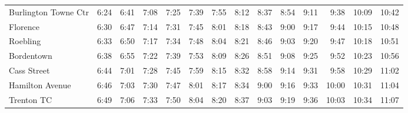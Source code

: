 \begin{center}
\begin{tabular}{@{}lrrrrrrrrrrrrr@{}}
Burlington Towne Ctr & 6:24 & 6:41 & 7:08 & 7:25 & 7:39 & 7:55 & 8:12 & 8:37 & 8:54 & 9:11 & 9:38 & 10:09 & 10:42 \\
Florence & 6:30 & 6:47 & 7:14 & 7:31 & 7:45 & 8:01 & 8:18 & 8:43 & 9:00 & 9:17 & 9:44 & 10:15 & 10:48 \\
Roebling & 6:33 & 6:50 & 7:17 & 7:34 & 7:48 & 8:04 & 8:21 & 8:46 & 9:03 & 9:20 & 9:47 & 10:18 & 10:51 \\
Bordentown & 6:38 & 6:55 & 7:22 & 7:39 & 7:53 & 8:09 & 8:26 & 8:51 & 9:08 & 9:25 & 9:52 & 10:23 & 10:56 \\
Cass Street & 6:44 & 7:01 & 7:28 & 7:45 & 7:59 & 8:15 & 8:32 & 8:58 & 9:14 & 9:31 & 9:58 & 10:29 & 11:02 \\
Hamilton Avenue & 6:46 & 7:03 & 7:30 & 7:47 & 8:01 & 8:17 & 8:34 & 9:00 & 9:16 & 9:33 & 10:00 & 10:31 & 11:04 \\
Trenton TC & 6:49 & 7:06 & 7:33 & 7:50 & 8:04 & 8:20 & 8:37 & 9:03 & 9:19 & 9:36 & 10:03 & 10:34 & 11:07 \\
\bottomrule\end{tabular}\end{center}
